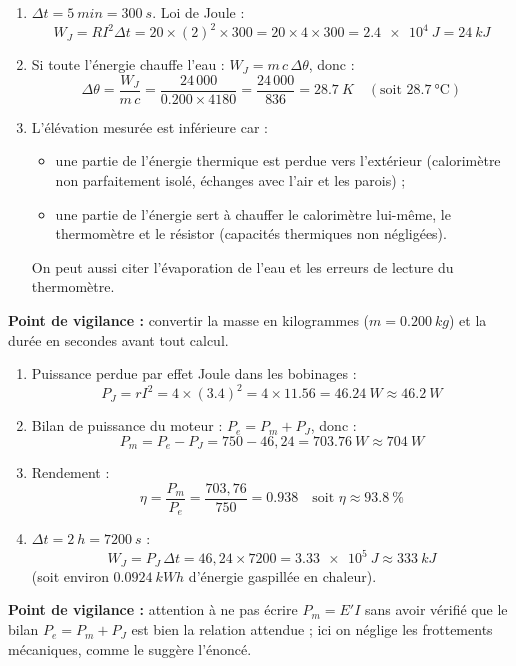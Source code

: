 \documentclass[11pt]{article}
\begin{document}
\begin{corrige}
\begin{enumerate}
\item $\Delta t = \SI{5}{min} = \SI{300}{s}$. Loi de Joule :
\[
W_J = R I^2 \Delta t = 20 \times (2)^2 \times 300 = 20 \times 4 \times 300 = \SI{2,4e4}{J} = \SI{24}{kJ}
\]
\item Si toute l'énergie chauffe l'eau : $W_J = m\,c\,\Delta\theta$, donc :
\[
\Delta\theta = \frac{W_J}{m\,c} = \frac{24\,000}{\num{0,200} \times 4180} = \frac{24\,000}{836} = \SI{28,7}{K} \quad (\text{soit } \SI{28,7}{\celsius})
\]
\item L'élévation mesurée est inférieure car :
\begin{itemize}
\item une partie de l'énergie thermique est perdue vers l'extérieur (calorimètre non parfaitement isolé, échanges avec l'air et les parois) ;
\item une partie de l'énergie sert à chauffer le calorimètre lui-même, le thermomètre et le résistor (capacités thermiques non négligées).
\end{itemize}
On peut aussi citer l'évaporation de l'eau et les erreurs de lecture du thermomètre.
\end{enumerate}
\textbf{Point de vigilance :} convertir la masse en kilogrammes ($m = \SI{0,200}{kg}$) et la durée en secondes avant tout calcul.
\end{corrige}

\begin{corrige}
\begin{enumerate}
\item Puissance perdue par effet Joule dans les bobinages :
\[
P_J = r I^2 = 4 \times (\num{3,4})^2 = 4 \times \num{11,56} = \SI{46,24}{W} \approx \SI{46,2}{W}
\]
\item Bilan de puissance du moteur : $P_e = P_m + P_J$, donc :
\[
P_m = P_e - P_J = 750 - 46,24 = \SI{703,76}{W} \approx \SI{704}{W}
\]
\item Rendement :
\[
\eta = \frac{P_m}{P_e} = \frac{703,76}{750} = \num{0,938} \quad \text{soit } \eta \approx \SI{93,8}{\%}
\]
\item $\Delta t = \SI{2}{h} = \SI{7200}{s}$ :
\[
W_J = P_J\,\Delta t = 46,24 \times 7200 = \SI{3,33e5}{J} \approx \SI{333}{kJ}
\]
(soit environ $\SI{0,0924}{kWh}$ d'énergie gaspillée en chaleur).
\end{enumerate}
\textbf{Point de vigilance :} attention à ne pas écrire $P_m = E' I$ sans avoir vérifié que le bilan $P_e = P_m + P_J$ est bien la relation attendue ; ici on néglige les frottements mécaniques, comme le suggère l'énoncé.
\end{corrige}
\end{document}
